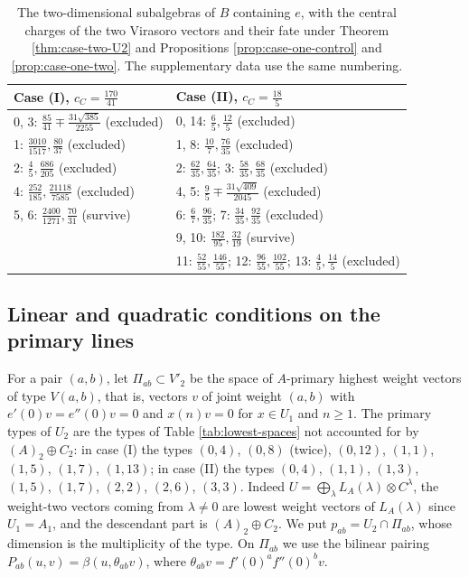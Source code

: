 \documentclass[leqno]{article}
\renewcommand{\geq}{\ensuremath{\geqslant}}
\newcommand{\ot}{\otimes}
\numberwithin{equation}{section}
\begin{document}
\begin{table}[ht]
\centering
\small
\begin{tabular}{l|l}
Case (I), $c_C = \frac{170}{41}$ & Case (II), $c_C = \frac{18}{5}$\\
\hline
0, 3: $\frac{85}{41} \mp \frac{31\sqrt{385}}{2255}$ \quad (excluded) & 0, 14: $\frac65,\frac{12}5$ \quad (excluded)\\
1: $\frac{3010}{1517},\frac{80}{37}$ \quad (excluded) & 1, 8: $\frac{10}{7},\frac{76}{35}$ \quad (excluded)\\
2: $\frac45,\frac{686}{205}$ \quad (excluded) & 2: $\frac{62}{35},\frac{64}{35}$; 3: $\frac{58}{35},\frac{68}{35}$ \quad (excluded)\\
4: $\frac{252}{185},\frac{21118}{7585}$ \quad (excluded) & 4, 5: $\frac95 \mp \frac{31\sqrt{409}}{2045}$ \quad (excluded)\\
5, 6: $\frac{2400}{1271},\frac{70}{31}$ \quad (survive) & 6: $\frac67,\frac{96}{35}$; 7: $\frac{34}{35},\frac{92}{35}$ \quad (excluded)\\
 & 9, 10: $\frac{182}{95},\frac{32}{19}$ \quad (survive)\\
 & 11: $\frac{52}{55},\frac{146}{55}$; 12: $\frac{96}{55},\frac{102}{55}$; 13: $\frac45,\frac{14}5$ \quad (excluded)
\end{tabular}
\caption{The two-dimensional subalgebras of $B$ containing $e$, with the central charges of the two Virasoro vectors and their fate under Theorem \ref{thm:case-two-U2} and Propositions \ref{prop:case-one-control} and \ref{prop:case-one-two}. The supplementary data use the same numbering.}
\label{tab:griess}
\end{table}

\subsection{Linear and quadratic conditions on the primary lines}

For a pair $(a,b)$, let $\Pi_{ab} \subset V'_2$ be the space of $A$-primary highest weight vectors of type $V(a,b)$, that is, vectors $v$ of joint weight $(a,b)$ with $e'(0)v = e''(0)v = 0$ and $x(n)v = 0$ for $x \in U_1$ and $n \geq 1$. The primary types of $U_2$ are the types of Table \ref{tab:lowest-spaces} not accounted for by $(A)_2 \oplus C_2$: in case (I) the types $(0,4)$, $(0,8)$ (twice), $(0,12)$, $(1,1)$, $(1,5)$, $(1,7)$, $(1,13)$; in case (II) the types $(0,4)$, $(1,1)$, $(1,3)$, $(1,5)$, $(1,7)$, $(2,2)$, $(2,6)$, $(3,3)$. Indeed $U = \bigoplus_\lambda L_A(\lambda) \ot C^\lambda$, the weight-two vectors coming from $\lambda \neq 0$ are lowest weight vectors of $L_A(\lambda)$ since $U_1 = A_1$, and the descendant part is $(A)_2 \oplus C_2$. We put $p_{ab} = U_2 \cap \Pi_{ab}$, whose dimension is the multiplicity of the type. On $\Pi_{ab}$ we use the bilinear pairing $P_{ab}(u,v) = \beta(u,\theta_{ab}v)$, where $\theta_{ab}v = f'(0)^a f''(0)^b v$.
\end{document}
